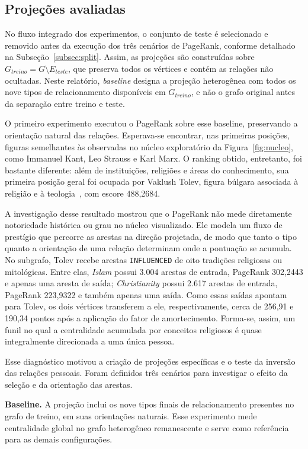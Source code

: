 \documentclass[10pt,a4paper]{article}
\begin{document}
\subsection{Projeções avaliadas}

No fluxo integrado dos experimentos, o conjunto de teste é selecionado e removido antes da execução dos três cenários de PageRank, conforme detalhado na Subseção~\ref{subsec:split}. Assim, as projeções são construídas sobre $G_{treino}=G\setminus E_{teste}$, que preserva todos os vértices e contém as relações não ocultadas. Neste relatório, \emph{baseline} designa a projeção heterogênea com todos os nove tipos de relacionamento disponíveis em $G_{treino}$, e não o grafo original antes da separação entre treino e teste.

O primeiro experimento executou o PageRank sobre esse baseline, preservando a orientação natural das relações. Esperava-se encontrar, nas primeiras posições, figuras semelhantes às observadas no núcleo exploratório da Figura~\ref{fig:nucleo}, como Immanuel Kant, Leo Strauss e Karl Marx. O ranking obtido, entretanto, foi bastante diferente: além de instituições, religiões e áreas do conhecimento, sua primeira posição geral foi ocupada por Vaklush Tolev, figura búlgara associada à religião e à teologia~\cite{vaklush-dbpedia}, com escore 488,2684.

A investigação desse resultado mostrou que o PageRank não mede diretamente notoriedade histórica ou grau no núcleo visualizado. Ele modela um fluxo de prestígio que percorre as arestas na direção projetada, de modo que tanto o tipo quanto a orientação de uma relação determinam onde a pontuação se acumula. No subgrafo, Tolev recebe arestas \texttt{INFLUENCED} de oito tradições religiosas ou mitológicas. Entre elas, \textit{Islam} possui 3.004 arestas de entrada, PageRank 302,2443 e apenas uma aresta de saída; \textit{Christianity} possui 2.617 arestas de entrada, PageRank 223,9322 e também apenas uma saída. Como essas saídas apontam para Tolev, os dois vértices transferem a ele, respectivamente, cerca de 256,91 e 190,34 pontos após a aplicação do fator de amortecimento. Forma-se, assim, um funil no qual a centralidade acumulada por conceitos religiosos é quase integralmente direcionada a uma única pessoa.

Esse diagnóstico motivou a criação de projeções específicas e o teste da inversão das relações pessoais. Foram definidos três cenários para investigar o efeito da seleção e da orientação das arestas.

\textbf{Baseline.} A projeção inclui os nove tipos finais de relacionamento presentes no grafo de treino, em suas orientações naturais. Esse experimento mede centralidade global no grafo heterogêneo remanescente e serve como referência para as demais configurações.
\end{document}
